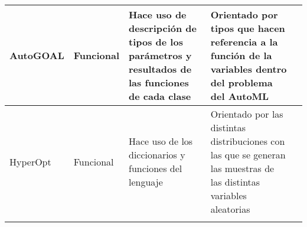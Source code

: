 \begin{longtable}{  p{2.15cm}  p{2.4cm}  p{4.75cm}  p{4.65cm}  p{5.45cm} }
    AutoGOAL                                                                                                                                                                                                                                                                                                                     &
    Funcional                                                                                                                                                                                                                                                                                                                    &
    Hace uso de descripción de tipos de los parámetros y resultados de las funciones de cada clase                                                                                                                                                                                                                               &
    Orientado por tipos que hacen referencia a la función de la variables dentro del problema del AutoML                                                                                                                                                                                                                         &
    \\
    \hline
    HyperOpt                                                                                                                                                                                                                                                                                                                     &
    Funcional                                                                                                                                                                                                                                                                                                                    &
    Hace uso de los diccionarios y funciones del lenguaje                                                                                                                                                                                                                                                                        &
    Orientado por las distintas distribuciones con las que se generan las muestras de las distintas variables aleatorias                                                                                                                                                                                                         &
    \\
    \hline
    \rowcolor{lavender}


\end{longtable}
